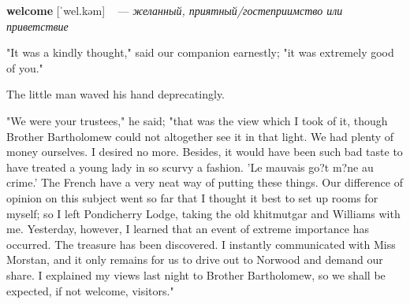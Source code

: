\documentclass[a4paper,oneside,12pt]{amsart}
\begin{document}
{{\bf welcome } [ˈwel.kəm] ~ --- \emph{ желанный, приятный/гостеприимство или приветствие }

} \vspace{6mm} {\Large 

 
"It was a kindly thought," said our companion earnestly; "it was extremely good of you."

The little man waved his hand deprecatingly.

"We were your trustees," he said; "that was the view which I took of it, though Brother Bartholomew could not altogether see it in that light. We had plenty of money ourselves. I desired no more. Besides, it would have been such bad taste to have treated a young lady in so scurvy a fashion. 'Le mauvais go?t m?ne au crime.' The French have a very neat way of putting these things. Our difference of opinion on this subject went so far that I thought it best to set up rooms for myself; so I left Pondicherry Lodge, taking the old khitmutgar and Williams with me. Yesterday, however, I learned that an event of extreme importance has occurred. The treasure has been discovered. I instantly communicated with Miss Morstan, and it only remains for us to drive out to Norwood and demand our share. I explained my views last night to Brother Bartholomew, so we shall be expected, if not welcome, visitors."
\\ } 
\end{document}
